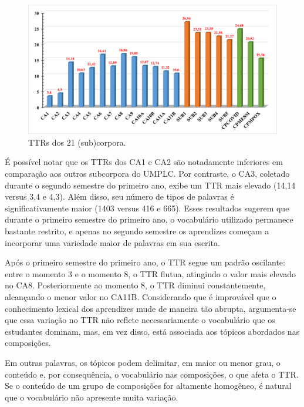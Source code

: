 \documentclass[portuguese]{textolivre}
\begin{document}
\begin{figure}
    \centering
    \label{Fig 1}
    \begin{minipage}{1\textwidth} \includegraphics[width=\textwidth]{ttr.png} \caption{TTRs dos 21 (sub)corpora.} \label{fig 1}
    
\end{minipage}
\end{figure}

É possível notar que os TTRs dos CA1 e CA2 são notadamente inferiores em comparação aos outros subcorpora do UMPLC. Por contraste, o CA3, coletado durante o segundo semestre do primeiro ano, exibe um TTR mais elevado (14,14 versus 3,4 e 4,3). Além disso, seu número de tipos de palavras é significativamente maior (1403 versus 416 e 665). Esses resultados sugerem que durante o primeiro semestre do primeiro ano, o vocabulário utilizado permanece bastante restrito, e apenas no segundo semestre os aprendizes começam a incorporar uma variedade maior de palavras em sua escrita.

Após o primeiro semestre do primeiro ano, o TTR segue um padrão oscilante: entre o momento 3 e o momento 8, o TTR flutua, atingindo o valor mais elevado no CA8. Posteriormente ao momento 8, o TTR diminui constantemente, alcançando o menor valor no CA11B. Considerando que é improvável que o conhecimento lexical dos aprendizes mude de maneira tão abrupta, argumenta-se que essa variação no TTR não reflete necessariamente o vocabulário que os estudantes dominam, mas, em vez disso, está associada aos tópicos abordados nas composições.

Em outras palavras, os tópicos podem delimitar, em maior ou menor grau, o conteúdo e, por consequência, o vocabulário nas composições, o que afeta o TTR. Se o conteúdo de um grupo de composições for altamente homogêneo, é natural que o vocabulário não apresente muita variação.
\end{document}
